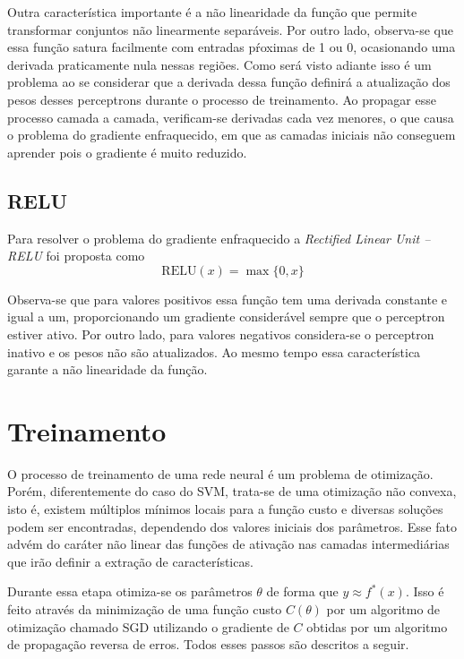 Outra característica importante é a não linearidade da função que permite transformar conjuntos não linearmente separáveis. Por outro lado, observa-se que essa função satura facilmente com entradas pŕoximas de 1 ou 0, ocasionando uma derivada praticamente nula nessas regiões. Como será visto adiante isso é um problema ao se considerar que a derivada dessa função definirá a atualização dos pesos desses perceptrons durante o processo de treinamento. Ao propagar esse processo camada a camada, verificam-se derivadas cada vez menores, o que causa o problema do gradiente enfraquecido, em que as camadas iniciais não conseguem aprender pois o gradiente é muito reduzido.

\subsection{RELU}
Para resolver o problema do gradiente enfraquecido a \textit{Rectified Linear Unit -- RELU} foi proposta \cite{nair2010relu} como
\begin{equation}
	\label{eq:relu}
	\text{RELU}(x) = \max\{0,x\}
\end{equation}

Observa-se que para valores positivos essa função tem uma derivada constante e igual a um, proporcionando um gradiente considerável sempre que o perceptron estiver ativo. Por outro lado, para valores negativos considera-se o perceptron inativo e os pesos não são atualizados. Ao mesmo tempo essa característica garante a não linearidade da função.

\section{Treinamento}
O processo de treinamento de uma rede neural é um problema de otimização. Porém, diferentemente do caso do SVM, trata-se de uma otimização não convexa, isto é, existem múltiplos mínimos locais para a função custo e diversas soluções podem ser encontradas, dependendo dos valores iniciais dos parâmetros. Esse fato advém do caráter não linear das funções de ativação nas camadas intermediárias que irão definir a extração de características.

Durante essa etapa otimiza-se os parâmetros $\theta$ de forma que $y \approx f^*(x)$. Isso é feito através da minimização de uma função custo $C(\theta)$ por um algoritmo de otimização chamado SGD utilizando o gradiente de $C$ obtidas por um algoritmo de propagação reversa de erros. Todos esses passos são descritos a seguir.

